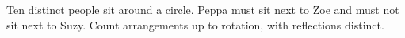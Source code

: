 Ten distinct people sit around a circle. Peppa must sit next to Zoe and must not sit next to Suzy. Count arrangements up to rotation, with reflections distinct.
